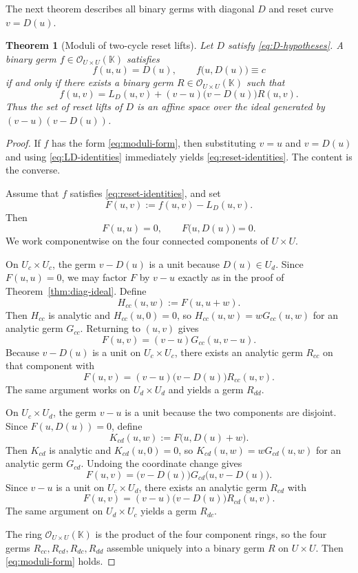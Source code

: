 \documentclass[11pt]{amsart}
\numberwithin{equation}{section}
\newtheorem{theorem}{Theorem}[section]
\theoremstyle{remark}
\theoremstyle{definition}
\newcommand{\K}{\mathbb{K}}
\newcommand{\Oc}{\mathcal{O}}
\begin{document}
The next theorem describes all binary germs with diagonal $D$ and reset curve $v=D(u)$.

\begin{theorem}[Moduli of two-cycle reset lifts]\label{thm:moduli-reset-lifts}
Let $D$ satisfy \eqref{eq:D-hypotheses}. A binary germ $f\in \Oc_{U\times U}(\K)$ satisfies
\begin{equation}\label{eq:reset-identities}
f(u,u)=D(u),\qquad f\bigl(u,D(u)\bigr)\equiv c
\end{equation}
if and only if there exists a binary germ $R\in \Oc_{U\times U}(\K)$ such that
\begin{equation}\label{eq:moduli-form}
f(u,v)=L_D(u,v)+(v-u)\bigl(v-D(u)\bigr)R(u,v).
\end{equation}
Thus the set of reset lifts of $D$ is an affine space over the ideal generated by $(v-u)(v-D(u))$.
\end{theorem}

\begin{proof}
If $f$ has the form \eqref{eq:moduli-form}, then substituting $v=u$ and $v=D(u)$ and using \eqref{eq:LD-identities} immediately yields \eqref{eq:reset-identities}. The content is the converse.

Assume that $f$ satisfies \eqref{eq:reset-identities}, and set
\[
F(u,v):=f(u,v)-L_D(u,v).
\]
Then
\[
F(u,u)=0,\qquad F\bigl(u,D(u)\bigr)=0.
\]
We work componentwise on the four connected components of $U\times U$.

On $U_c\times U_c$, the germ $v-D(u)$ is a unit because $D(u)\in U_d$. Since $F(u,u)=0$, we may factor $F$ by $v-u$ exactly as in the proof of Theorem~\ref{thm:diag-ideal}. Define
\[
H_{cc}(u,w):=F(u,u+w).
\]
Then $H_{cc}$ is analytic and $H_{cc}(u,0)=0$, so $H_{cc}(u,w)=wG_{cc}(u,w)$ for an analytic germ $G_{cc}$. Returning to $(u,v)$ gives
\[
F(u,v)=(v-u)G_{cc}(u,v-u).
\]
Because $v-D(u)$ is a unit on $U_c\times U_c$, there exists an analytic germ $R_{cc}$ on that component with
\[
F(u,v)=(v-u)\bigl(v-D(u)\bigr)R_{cc}(u,v).
\]
The same argument works on $U_d\times U_d$ and yields a germ $R_{dd}$.

On $U_c\times U_d$, the germ $v-u$ is a unit because the two components are disjoint. Since $F(u,D(u))=0$, define
\[
K_{cd}(u,w):=F\bigl(u,D(u)+w\bigr).
\]
Then $K_{cd}$ is analytic and $K_{cd}(u,0)=0$, so $K_{cd}(u,w)=wG_{cd}(u,w)$ for an analytic germ $G_{cd}$. Undoing the coordinate change gives
\[
F(u,v)=\bigl(v-D(u)\bigr)G_{cd}\bigl(u,v-D(u)\bigr).
\]
Since $v-u$ is a unit on $U_c\times U_d$, there exists an analytic germ $R_{cd}$ with
\[
F(u,v)=(v-u)\bigl(v-D(u)\bigr)R_{cd}(u,v).
\]
The same argument on $U_d\times U_c$ yields a germ $R_{dc}$.

The ring $\Oc_{U\times U}(\K)$ is the product of the four component rings, so the four germs $R_{cc},R_{cd},R_{dc},R_{dd}$ assemble uniquely into a binary germ $R$ on $U\times U$. Then \eqref{eq:moduli-form} holds.
\end{proof}
\end{document}
